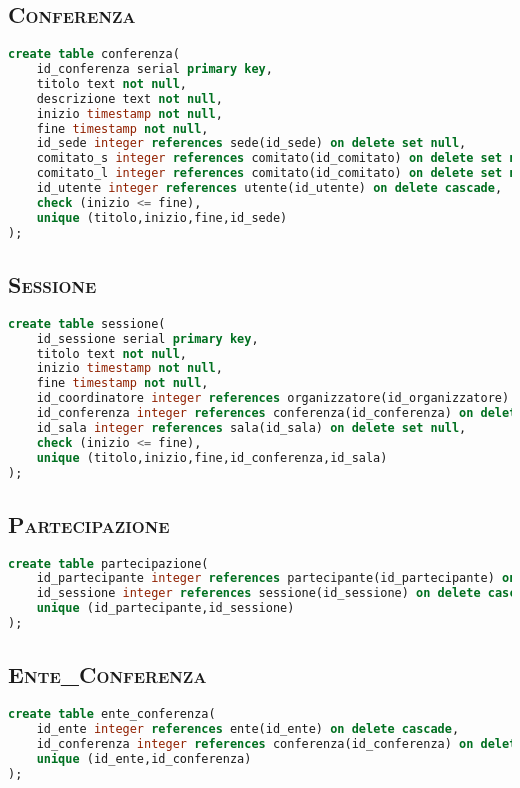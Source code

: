 \subsection{\textsc{Conferenza}}
\begin{lstlisting}[language=SQL,style=mystyle, caption={Tabella: Conferenza}]
create table conferenza(
    id_conferenza serial primary key,
    titolo text not null,
    descrizione text not null,
    inizio timestamp not null,
    fine timestamp not null,
    id_sede integer references sede(id_sede) on delete set null,
    comitato_s integer references comitato(id_comitato) on delete set null,
    comitato_l integer references comitato(id_comitato) on delete set null,
    id_utente integer references utente(id_utente) on delete cascade,
    check (inizio <= fine),
    unique (titolo,inizio,fine,id_sede)
);
\end{lstlisting}
\subsection{\textsc{Sessione}}
\begin{lstlisting}[language=SQL,style=mystyle, caption={Tabella: Sessione}]
create table sessione(
    id_sessione serial primary key,
    titolo text not null,
    inizio timestamp not null,
    fine timestamp not null,
    id_coordinatore integer references organizzatore(id_organizzatore) on delete set null,
    id_conferenza integer references conferenza(id_conferenza) on delete cascade,
    id_sala integer references sala(id_sala) on delete set null,
    check (inizio <= fine),
    unique (titolo,inizio,fine,id_conferenza,id_sala)
);
\end{lstlisting}
\subsection{\textsc{Partecipazione}}
\begin{lstlisting}[language=SQL,style=mystyle, caption={Tabella: Partecipazione}]
create table partecipazione(
    id_partecipante integer references partecipante(id_partecipante) on delete cascade,
    id_sessione integer references sessione(id_sessione) on delete cascade,
    unique (id_partecipante,id_sessione) 
);
\end{lstlisting}
\subsection{\textsc{Ente\_Conferenza}}
\begin{lstlisting}[language=SQL,style=mystyle, caption={Tabella: Ente\_Conferenza}]
create table ente_conferenza(
    id_ente integer references ente(id_ente) on delete cascade,
    id_conferenza integer references conferenza(id_conferenza) on delete cascade,
    unique (id_ente,id_conferenza)
);
\end{lstlisting}
